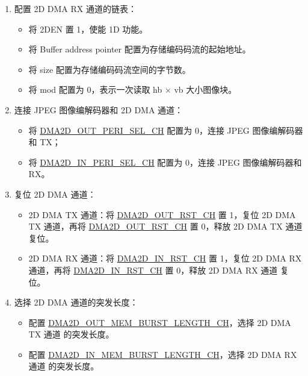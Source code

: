 \documentclass[main\_\_CN.tex]{subfiles}
\begin{document}
\begin{enumerate}
\begin{enumerate}
\begin{itemize}
{\begin{longtable}{ | L{4cm} | L{4cm} | l | l |}
                \end{longtable}
            }
        \end{itemize}
        \item 配置 2D DMA RX 通道的链表：
        \begin{itemize}
            \item 将 2DEN 置 1，使能 1D 功能。
            \item 将 Buffer address pointer 配置为存储编码码流的起始地址。
            \item 将 size 配置为存储编码码流空间的字节数。
            \item 将 mod 配置为 0，表示一次读取 hb × vb 大小图像块。
        \end{itemize}
        \item 连接 JPEG 图像编解码器和 2D DMA 通道：
        \begin{itemize}
            \item 将 \hyperref[fielddesc:DMA2DOUTPERISELCHN]{DMA2D\_OUT\_PERI\_SEL\_CH} 配置为 0，连接 JPEG 图像编解码器和 TX；
            \item 将 \hyperref[fielddesc:DMA2DINPERISELCHN]{DMA2D\_IN\_PERI\_SEL\_CH} 配置为 0，连接 JPEG 图像编解码器和 RX。
        \end{itemize}
        \item 复位 2D DMA 通道：
        \begin{itemize}
            \item 2D DMA TX 通道：将 \hyperref[fielddesc:DMA2DOUTRSTCHN]{DMA2D\_OUT\_RST\_CH} 置 1，复位 2D DMA TX 通道，再将 \hyperref[fielddesc:DMA2DOUTRSTCHN]{DMA2D\_OUT\_RST\_CH} 置 0，释放 2D DMA TX 通道 复位。
            \item 2D DMA RX 通道：将 \hyperref[fielddesc:DMA2DINRSTCHN]{DMA2D\_IN\_RST\_CH} 置 1，复位 2D DMA RX 通道，再将 \hyperref[fielddesc:DMA2DINRSTCHN]{DMA2D\_IN\_RST\_CH} 置 0，释放 2D DMA RX 通道 复位。
        \end{itemize}
        \item 选择 2D DMA 通道的突发长度：
        \begin{itemize}
            \item 配置 \hyperref[fielddesc:DMA2DOUTMEMBURSTLENGTHCHN]{DMA2D\_OUT\_MEM\_BURST\_LENGTH\_CH}，选择 2D DMA TX 通道 的突发长度。
            \item 配置 \hyperref[fielddesc:DMA2DINMEMBURSTLENGTHCHN]{DMA2D\_IN\_MEM\_BURST\_LENGTH\_CH}，选择 2D DMA RX 通道 的突发长度。

\end{itemize}
\end{enumerate}
\end{enumerate}
\end{document}

